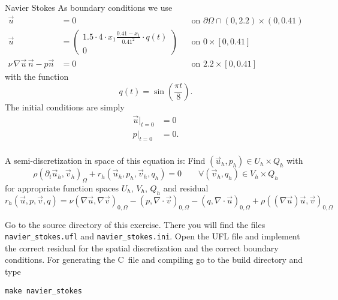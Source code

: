 \documentclass[12pt,a4paper]{article}
\def\CC{{C\nolinebreak[4]\hspace{-.05em}\raisebox{.4ex}{\tiny\bf ++}}}
\begin{document}
\begin{Exercise}{Navier Stokes}
  As boundary conditions we use
  \begin{align*}
    \vec{u} &= 0 && \text{on $\partial\Omega \cap (0,2.2)\times(0,0.41)$} \\
    \vec{u} &=
    \begin{pmatrix}
      1.5 \cdot 4 \cdot x_1 \frac{0.41-x_1}{0.41^2} \cdot q(t) \\ 0
    \end{pmatrix} && \text{on $0\times[0,0.41]$}\\
    \nu \, \nabla \vec{u} \, \vec{n} - p\vec{n} &= 0 && \text{on $2.2\times[0,0.41]$}
  \end{align*}
  with the function
  \begin{equation*}
    q(t) = \sin\left(\frac{\pi t}{8}\right).
  \end{equation*}
  The initial conditions are simply
  \begin{align*}
    \vec{u}|_{t=0} &= 0 \\
    p|_{t=0} &= 0. \\
  \end{align*}

  A semi-discretization in space of this equation is: Find
  $(\vec{u}_h,p_h) \in U_h\times Q_h$ with
  \begin{equation*}
    \rho (\partial_t \vec{u}_h, \vec{v}_h)_\Omega + r_h(\vec{u}_h, p_h, \vec{v}_h, q_h) = 0 \qquad \forall (\vec{v}_h,q_h) \in V_h\times Q_h
  \end{equation*}
  for appropriate function spaces $U_h$, $V_h$, $Q_h$ and residual
  \begin{equation}
    r_h(\vec{u},p,\vec{v},q)
    = \nu (\nabla \vec{u}, \nabla \vec{v})_{0,\Omega}
    - (p, \nabla \cdot \vec{v})_{0,\Omega}
    - (q, \nabla \cdot \vec{u})_{0, \Omega}
    + \rho ((\nabla \vec{u}) \vec{u}, \vec{v})_{0, \Omega}
    \label{eq:ns-residual}
  \end{equation}

  Go to the source directory of this exercise. There you will find the files
  \lstinline{navier_stokes.ufl} and \lstinline{navier_stokes.ini}. Open the UFL
  file and implement the correct residual for the spatial discretization and
  the correct boundary conditions. For generating the \CC\ file and compiling
  go to the build directory and type
  \begin{lstlisting}
make navier_stokes
  \end{lstlisting}


\end{Exercise}
\end{document}
